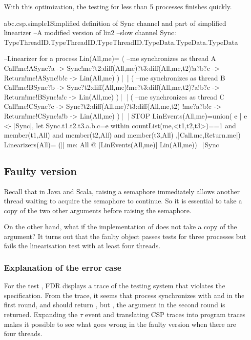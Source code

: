 \documentclass[a4paper, 12pt]{article}
\begin{document}
With this optimization, the testing for less than 5 processes finishes quickly.

\begin{cspfloat}{abc.csp.simple1}{Simplified definition of Sync channel and part of simplified linearizer}
  --A modified version of lin2
  --slow
  channel Sync: TypeThreadID.TypeThreadID.TypeThreadID.TypeData.TypeData.TypeData
  
  --Linearizer for a process
  Lin(All,me)= (
        --me synchronizes as thread A
        Call!me!ASync?a ->
        Sync!me?t2:diff(All,{me})?t3:diff(All,{me,t2})!a?b?c ->
        Return!me!ASync!b!c ->
        Lin(All,me)
      ) |~| (
        --me synchronizes as thread B
        Call!me!BSync?b ->
        Sync?t2:diff(All,{me})!me?t3:diff(All,{me,t2})?a!b?c ->
        Return!me!BSync!a!c ->
        Lin(All,me)
      ) |~| (
        --me synchronizes as thread C
        Call!me!CSync?c ->
        Sync?t2:diff(All,{me})?t3:diff(All,{me,t2}) !me?a?b!c ->
        Return!me!CSync!a!b ->
        Lin(All,me)
      ) |~| STOP
  LinEvents(All,me)=union({
    e | e <- {|Sync|},
    let Sync.t1.t2.t3.a.b.c=e within
      countList(me,<t1,t2,t3>)==1 and member(t1,All) and member(t2,All) and member(t3,All)
  },{|Call.me,Return.me|})
  Linearizers(All)= (|| me: All @ [LinEvents(All,me)]  Lin(All,me)) \ {|Sync|}
\end{cspfloat}

\subsection{Faulty version}
Recall that in Java and Scala, raising a semaphore immediately allows another thread waiting to acquire the semaphore to continue. So it is essential to take a copy of the two other arguments before raising the semaphore.

On the other hand, what if the implementation of  does not take a copy of the argument? It turns out that the faulty  object passes tests for three processes but fails the linearisation test with at least four threads.


\subsubsection{Explanation of the error case}
For the test \CSPM{Spec4Thread [T= System4}, FDR displays a trace of the testing system that violates the specification. From the trace, it seems that process  synchronizes with  and  in the first round, and should return , but , the argument in the second round is returned. Expanding the $\tau$ event and translating CSP traces into program traces makes it possible to see what goes wrong in the faulty version when there are four threads.
\end{document}
